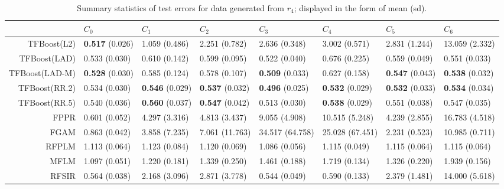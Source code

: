 \begin{table}[H]
\centering
\footnotesize
\begin{tabular}{rlllllll}
  \hline
 & $C_0$ & $C_1$ & $C_2$ & $C_3$ & $C_4$ & $C_5$ & $C_6$ \\ 
  \hline
TFBoost(L2) & \textbf{0.517} (0.026) & 1.059 (0.486) & 2.251 (0.782) & 2.636 (0.348) & 3.002 (0.571) & 2.831 (1.244) & 13.059 (2.332) \\ 
  TFBoost(LAD) & 0.533 (0.030) & 0.610 (0.142) & 0.599 (0.095) & 0.522 (0.040) & 0.676 (0.225) & 0.559 (0.049) & 0.551 (0.033) \\ 
  TFBoost(LAD-M) & \textbf{0.528} (0.030) & 0.585 (0.124) & 0.578 (0.107) & \textbf{0.509} (0.033) & 0.627 (0.158) & \textbf{0.547} (0.043) & \textbf{0.538} (0.032) \\ 
  TFBoost(RR.2) & 0.534 (0.030) & \textbf{0.546} (0.029) & \textbf{0.537} (0.032) & \textbf{0.496} (0.025) & \textbf{0.532} (0.029) & \textbf{0.532} (0.033) & \textbf{0.534} (0.034) \\ 
  TFBoost(RR.5) & 0.540 (0.036) & \textbf{0.560} (0.037) & \textbf{0.547} (0.042) & 0.513 (0.030) & \textbf{0.538} (0.029) & 0.551 (0.038) & 0.547 (0.035) \\ 
  FPPR & 0.601 (0.052) & 4.297 (3.316) & 4.813 (3.437) & 9.055 (4.908) & 10.515 (5.248) & 4.239 (2.855) & 16.783 (4.518) \\ 
  FGAM & 0.863 (0.042) & 3.858 (7.235) & 7.061 (11.763) & 34.517 (64.758) & 25.028 (67.451) & 2.231 (0.523) & 10.985 (0.711) \\ 
  RFPLM & 1.113 (0.064) & 1.123 (0.084) & 1.120 (0.069) & 1.086 (0.056) & 1.115 (0.049) & 1.115 (0.064) & 1.115 (0.064) \\ 
  MFLM & 1.097 (0.051) & 1.220 (0.181) & 1.339 (0.250) & 1.461 (0.188) & 1.719 (0.134) & 1.326 (0.220) & 1.939 (0.156) \\ 
  RFSIR & 0.564 (0.038) & 2.168 (3.096) & 2.871 (3.778) & 0.544 (0.049) & 0.590 (0.133) & 2.379 (1.481) & 14.000 (5.618) \\ 
   \hline
\end{tabular}
\caption{Summary statistics of test errors for data generated from $r_4$; displayed in the form of mean (sd).} 
\end{table}
